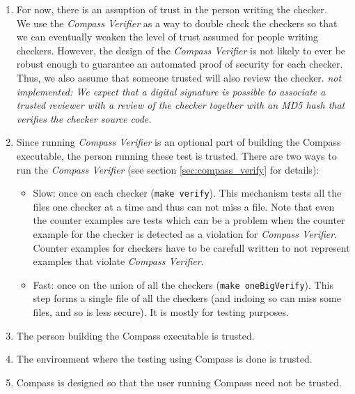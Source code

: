 \begin{enumerate}
   \item For now, there is an assuption of trust in the person writing the checker. \\
      We use the \emph{Compass Verifier} as a way to double check the 
      checkers so that we can eventually weaken the level of trust assumed for people 
      writing checkers. However, the design of the \emph{Compass Verifier} is not likely to
      ever be robust enough to guarantee an automated proof of security for each checker.  
      Thus, we also assume that someone trusted will also review the checker.
      {\em not implemented: We expect that a digital signature is possible to associate 
      a trusted reviewer with a review of the checker together with an MD5 hash that
      verifies the checker source code.}

   \item Since running \emph{Compass Verifier} is an optional part of building 
      the Compass executable, the person running these test is trusted. There are
      two ways to run the \emph{Compass Verifier} (see section \ref{sec:compass_verify}
    for details):
      \begin{itemize}
         \item Slow: once on each checker ({\tt make verify}). This mechanism
            tests all the files one checker at a time and thus can not miss 
            a file.  Note that even the counter examples are tests which can 
            be a problem when the counter example for the checker is detected
            as a violation for \emph{Compass Verifier}.  Counter examples for
            checkers have to be carefull written to not represent examples that
            violate \emph{Compass Verifier}.
         \item Fast: once on the union of all the checkers ({\tt make oneBigVerify}).
            This step forms a single file of all the checkers (and indoing so can
            miss some files, and so is less secure).  It is mostly for testing 
            purposes.
      \end{itemize}

   \item The person building the Compass executable is trusted.

   \item The environment where the testing using Compass is done is trusted.

   \item Compass is designed so that the user running Compass need not be trusted.

\end{enumerate}

